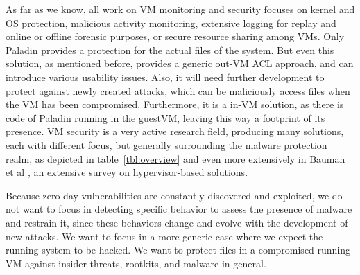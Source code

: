 \par As far as we know, all work on \ac{VM} monitoring and security focuses on kernel and \ac{OS} protection, malicious activity monitoring, extensive logging for replay and online or offline forensic purposes, or secure resource sharing among \ac{VM}s. Only Paladin \cite{baliga2008automated} provides a protection for the actual files of the system. But even this solution, as mentioned before, provides a generic out-\ac{VM} \ac{ACL} approach, and can introduce various usability issues. Also, it will need further development to protect against newly created attacks, which can be maliciously access files when the \ac{VM} has been compromised. Furthermore, it is a in-\ac{VM} solution, as there is code of Paladin running in the guest\ac{VM}, leaving this way a footprint of its presence. \ac{VM} security is a very active research field, producing many solutions, each with different focus, but generally surrounding the malware protection realm, as depicted in table~\ref{tbl:overview} and even more extensively in Bauman et al \cite{bauman2015survey}, an extensive survey on hypervisor-based solutions.


\par Because zero-day vulnerabilities are constantly discovered and exploited, we do not want to focus in detecting specific behavior to assess the presence of malware and restrain it, since these behaviors change and evolve with the development of new attacks. We want to focus in a more generic case where we expect the running system to be hacked. We want to protect files in a compromised running \ac{VM} against insider threats, rootkits, and malware in general. 



